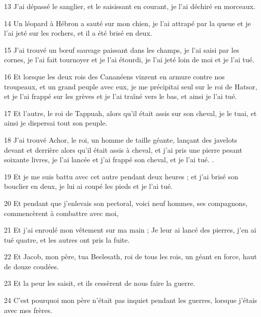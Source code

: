 \par 13 J'ai dépassé le sanglier, et le saisissant en courant, je l'ai déchiré en morceaux.

\par 14 Un léopard à Hébron a sauté sur mon chien, je l'ai attrapé par la queue et je l'ai jeté sur les rochers, et il a été brisé en deux.

\par 15 J'ai trouvé un bœuf sauvage paissant dans les champs, je l'ai saisi par les cornes, je l'ai fait tournoyer et je l'ai étourdi, je l'ai jeté loin de moi et je l'ai tué.

\par 16 Et lorsque les deux rois des Cananéens vinrent en armure contre nos troupeaux, et un grand peuple avec eux, je me précipitai seul sur le roi de Hatsor, et je l'ai frappé sur les grèves et je l'ai traîné vers le bas, et ainsi je l'ai tué.

\par 17 Et l'autre, le roi de Tappuah, alors qu'il était assis sur son cheval, je le tuai, et ainsi je dispersai tout son peuple.

\par 18 J'ai trouvé Achor, le roi, un homme de taille géante, lançant des javelots devant et derrière alors qu'il était assis à cheval, et j'ai pris une pierre pesant soixante livres, je l'ai lancée et j'ai frappé son cheval, et je l'ai tué. .

\par 19 Et je me suis battu avec cet autre pendant deux heures ; et j'ai brisé son bouclier en deux, je lui ai coupé les pieds et je l'ai tué.

\par 20 Et pendant que j'enlevais son pectoral, voici neuf hommes, ses compagnons, commencèrent à combattre avec moi,

\par 21 Et j'ai enroulé mon vêtement sur ma main ; Je leur ai lancé des pierres, j'en ai tué quatre, et les autres ont pris la fuite.

\par 22 Et Jacob, mon père, tua Beelesath, roi de tous les rois, un géant en force, haut de douze coudées.

\par 23 Et la peur les saisit, et ils cessèrent de nous faire la guerre.

\par 24 C'est pourquoi mon père n'était pas inquiet pendant les guerres, lorsque j'étais avec mes frères.

